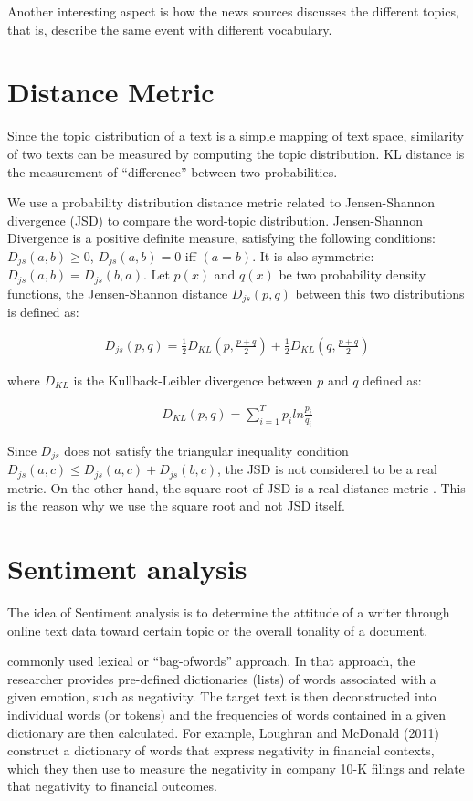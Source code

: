 \documentclass[12pt,a4paper,notitlepage]{article}
\begin{document}
Another interesting aspect is how the news sources discusses the different topics, that is, describe the same event with different vocabulary.

\section{Distance Metric}

Since the topic distribution of a text is a simple mapping of text space, similarity of two texts can be measured by computing the topic distribution. KL distance is the measurement of “difference” between two probabilities. 

We use a probability distribution distance metric related to Jensen-Shannon divergence (JSD) to compare the word-topic distribution. Jensen-Shannon Divergence is a positive definite measure, satisfying the following conditions: $D_{js}(a,b) \geq 0$, $D_{js}(a,b)=0$ iff $(a=b)$. It is also symmetric: $D_{js}(a,b)=D_{js}(b,a)$. Let $p(x)$ and $q(x)$ be two probability density functions, the Jensen-Shannon distance $D_{js}(p,q)$ between this two distributions is defined as:

\begin{align*}
	D_{js}(p,q)=\frac{1}{2}D_{KL}(p,\frac{p+q}{2})+\frac{1}{2}D_{KL}(q,\frac{p+q}{2})
\end{align*}

where $D_{KL}$ is the Kullback-Leibler divergence between $p$ and $q$ defined as:

\begin{align*}
	D_{KL}(p,q)=\sum_{i=1}^T p_i ln \frac{p_i}{q_i}
\end{align*}

Since $D_{js}$ does not satisfy the triangular inequality condition $D_{js}(a,c)\leq D_{js}(a,c)+D_{js}(b,c)$, the JSD is not considered to be a real metric. On the other hand, the square root of JSD is a real distance metric \citep{endres_new_2003}. This is the reason why we use the square root and not JSD itself. 

\section{Sentiment analysis}

The idea of Sentiment analysis is to determine the attitude of a writer through online text data toward certain topic or the overall tonality of a document.

commonly used lexical or “bag-ofwords” approach. In that approach, the researcher provides pre-defined dictionaries (lists) of words associated with a given emotion, such as negativity. The target text is then deconstructed into individual words (or tokens) and the frequencies of words contained in a given dictionary are then calculated. For example, Loughran and McDonald (2011) construct a dictionary of words that express negativity in financial contexts, which they then use to measure the negativity in company 10-K filings and relate that negativity to financial outcomes.
\end{document}
